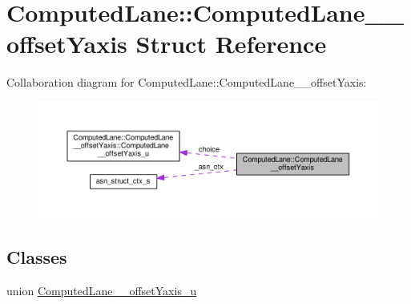 \hypertarget{structComputedLane_1_1ComputedLane____offsetYaxis}{}\section{Computed\+Lane\+:\+:Computed\+Lane\+\_\+\+\_\+offset\+Yaxis Struct Reference}
\label{structComputedLane_1_1ComputedLane____offsetYaxis}


Collaboration diagram for Computed\+Lane\+:\+:Computed\+Lane\+\_\+\+\_\+offset\+Yaxis\+:\nopagebreak
\begin{figure}[H]
\begin{center}
\leavevmode
\includegraphics[width=350pt]{structComputedLane_1_1ComputedLane____offsetYaxis__coll__graph}
\end{center}
\end{figure}
\subsection*{Classes}
\begin{DoxyCompactItemize}
\item 
union \hyperlink{unionComputedLane_1_1ComputedLane____offsetYaxis_1_1ComputedLane____offsetYaxis__u}{Computed\+Lane\+\_\+\+\_\+offset\+Yaxis\+\_\+u}
\end{DoxyCompactItemize}
